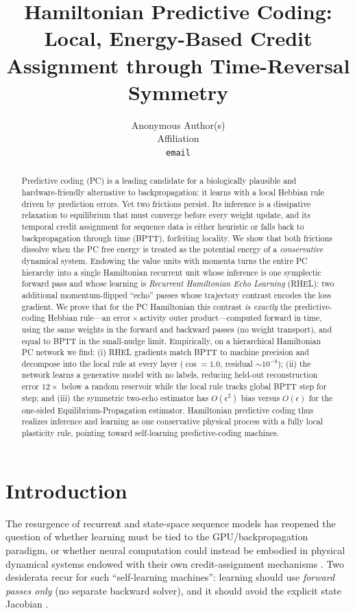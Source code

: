 \documentclass[10pt]{article}
\title{\bf Hamiltonian Predictive Coding:\\
Local, Energy-Based Credit Assignment through Time-Reversal Symmetry}
\author{Anonymous Author(s)\\ Affiliation\\ \texttt{email}}
\date{}
\theoremstyle{remark}
\newcommand{\eps}{\epsilon}
\begin{document}
\maketitle

\begin{abstract}
Predictive coding (PC) is a leading candidate for a biologically plausible
and hardware-friendly alternative to backpropagation: it learns with a local
Hebbian rule driven by prediction errors. Yet two frictions persist. Its
inference is a dissipative relaxation to equilibrium that must converge
before every weight update, and its temporal credit assignment for sequence
data is either heuristic or falls back to backpropagation through time
(BPTT), forfeiting locality. We show that both frictions dissolve when the PC
free energy is treated as the potential energy of a \emph{conservative}
dynamical system. Endowing the value units with momenta turns the entire PC
hierarchy into a single Hamiltonian recurrent unit whose inference is one
symplectic forward pass and whose learning is \emph{Recurrent Hamiltonian
Echo Learning} (RHEL): two additional momentum-flipped ``echo'' passes whose
trajectory contrast encodes the loss gradient. We prove that for the PC
Hamiltonian this contrast \emph{is exactly} the predictive-coding Hebbian
rule---an error\,$\times$\,activity outer product---computed forward in time,
using the same weights in the forward and backward passes (no weight
transport), and equal to BPTT in the small-nudge limit. Empirically, on a
hierarchical Hamiltonian PC network we find: (i) RHEL gradients match BPTT to
machine precision and decompose into the local rule at every layer
($\cos=1.0$, residual $\sim\!10^{-8}$); (ii) the network learns a generative
model with no labels, reducing held-out reconstruction error $12\times$ below
a random reservoir while the local rule tracks global BPTT step for step; and
(iii) the symmetric two-echo estimator has $O(\eps^2)$ bias versus $O(\eps)$
for the one-sided Equilibrium-Propagation estimator. Hamiltonian predictive
coding thus realizes inference and learning as one conservative physical
process with a fully local plasticity rule, pointing toward self-learning
predictive-coding machines.
\end{abstract}

\section{Introduction}
\label{sec:intro}

The resurgence of recurrent and state-space sequence models has reopened the
question of whether learning must be tied to the GPU/backpropagation
paradigm, or whether neural computation could instead be embodied in physical
dynamical systems endowed with their own credit-assignment mechanisms
\citep{rhel,physnn,hardwarelottery}. Two desiderata recur for such
``self-learning machines'': learning should use \emph{forward passes only}
(no separate backward solver), and it should avoid the explicit state
Jacobian \citep{rhel}.
\end{document}
